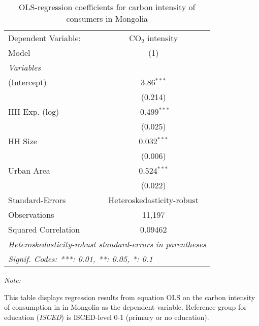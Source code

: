 
\begin{table}[htbp!]
   \centering
   \small
   \begin{adjustbox}{width = 1\textwidth, max height = 0.95\textheight, center}
      \begin{threeparttable}[b]
         \caption{\label{tab:OLS_1_MNG} OLS-regression coefficients for carbon intensity of consumers in Mongolia}
         \begin{tabular}{lc}
            \tabularnewline \midrule \midrule
            Dependent Variable: & CO$_{2}$ intensity\\  
            Model               & (1)\\  
            \midrule
            \emph{Variables}\\
            (Intercept)         & 3.86$^{***}$\\   
                                & (0.214)\\   
            HH Exp. (log)       & -0.499$^{***}$\\   
                                & (0.025)\\   
            HH Size             & 0.032$^{***}$\\   
                                & (0.006)\\   
            Urban Area          & 0.524$^{***}$\\   
                                & (0.022)\\   
            \midrule 
            Standard-Errors     & Heteroskedasticity-robust \\   
            Observations        & 11,197\\  
            Squared Correlation & 0.09462\\  
            \midrule \midrule
            \multicolumn{2}{l}{\emph{Heteroskedasticity-robust standard-errors in parentheses}}\\
            \multicolumn{2}{l}{\emph{Signif. Codes: ***: 0.01, **: 0.05, *: 0.1}}\\
         \end{tabular}
         
         \begin{tablenotes}\item \medskip \textit{Note:}
            \item This table displays regression results from equation OLS on the carbon intensity of consumption in  in Mongolia as the dependent variable. Reference group for education (\textit{ISCED}) is ISCED-level 0-1 (primary or no education).
         \end{tablenotes}
      \end{threeparttable}
   \end{adjustbox}
\end{table}


